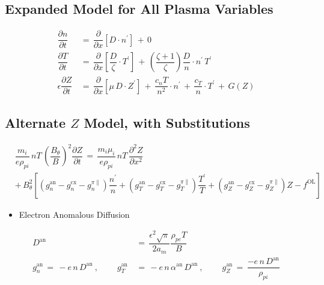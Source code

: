 \documentclass[a4paper,10pt]{article}
\providecommand{\tightlist}{%
  \setlength{\itemsep}{0pt}\setlength{\parskip}{0pt}}
\begin{document}
\subsection{Expanded Model for All Plasma
Variables}\label{expanded-model-for-all-plasma-variables}

\begin{align}
    \dfrac{\partial n}{\partial t} \,&=\, \dfrac{\partial}{\partial x}\left[D \cdot n^\prime\right] \,+\, 0 \\
    \dfrac{\partial T}{\partial t} \,&=\, \dfrac{\partial}{\partial x}\left[\dfrac{D}{\zeta} \cdot T^\prime\right] \,+\, \left(\dfrac{\zeta + 1}{\zeta}\right) \dfrac{D}{n} \cdot n^\prime \, T^\prime \\
    \epsilon \dfrac{\partial Z}{\partial t} \,&=\, \dfrac{\partial}{\partial x}\left[\mu\,D \cdot Z^\prime\right] \,+\, \dfrac{c_n T}{n^2} \cdot n^\prime \,+\, \dfrac{c_T}{n} \cdot T^\prime \,+\, G(Z)
\end{align}

\subsection{\texorpdfstring{Alternate \(Z\) Model, with
Substitutions}{Alternate Z Model, with Substitutions}}\label{alternate-z-model-with-substitutions}

\begin{align}
    &\dfrac{m_i}{e \rho_{pi}} \,n T\, \left(\dfrac{B_\theta}{B}\right)^2 \dfrac{\partial Z}{\partial t} \,=\, \dfrac{m_i \mu_i}{e \rho_{pi}} \,n T\, \dfrac{\partial^2 Z}{\partial x^2} \\
    &+\, B_\theta^2 \left[\left(g_n^\text{an} - g_n^\text{cx} - g_n^{\pi\parallel}\right) \dfrac{n^\prime}{n} + \left(g_T^\text{an} - g_T^\text{cx} - g_T^{\pi\parallel}\right) \dfrac{T^\prime}{T} + \left(g_Z^\text{an} - g_Z^\text{cx} - g_Z^{\pi\parallel}\right) Z - f^\text{OL}\right]
\end{align}

\begin{itemize}
\tightlist
\item
  Electron Anomalous Diffusion
\end{itemize}

\begin{align}
    D^\text{an} \,&=\, \dfrac{\epsilon^2 \sqrt{\pi}}{2 a_m} \dfrac{\rho_{pe} T}{B} \\
    g_n^\text{an} \,=\, -e \,n\, D^\text{an}~,~~~~~~~~~~ g_T^\text{an} \,&=\, -e \,n\, \alpha^\text{an}\, D^\text{an}~,~~~~~~~~~~ g_Z^\text{an} \,=\, \dfrac{-e \,n\, D^\text{an}}{\rho_{pi}}
\end{align}
\end{document}

